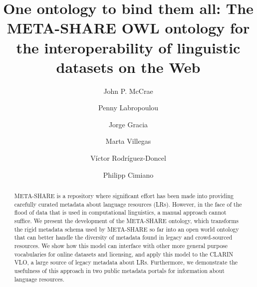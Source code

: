 \documentclass{llncs}
\begin{document}
\title{One ontology to bind them all: The META-SHARE OWL ontology for the interoperability of linguistic datasets on the Web}
%
%
\author{John P. McCrae \and Penny Labropoulou \and Jorge
Gracia \and Marta Villegas \and V\'ictor Rodr\'iguez-Doncel \and Philipp Cimiano}
%
%
%
\maketitle %
\begin{abstract}
    META-SHARE is a repository where significant effort has been made into
    providing carefully curated metadata about language resources (LRs).
    However, in the face of the flood of data that is used in computational
    linguistics, a manual approach cannot suffice. We present the development of
    the META-SHARE ontology, which transforms the rigid metadata schema used by META-SHARE so far into an open world ontology that can better handle the diversity of
    metadata found in legacy and crowd-sourced resources. We show how this model can interface with other more general
    purpose vocabularies for online datasets and licensing, and apply this model
    to the CLARIN VLO, a large source of legacy metadata about LRs. Furthermore,
    we demonstrate the usefulness of this approach in two public metadata
    portals for information about language resources.
\end{abstract}
\end{document}
